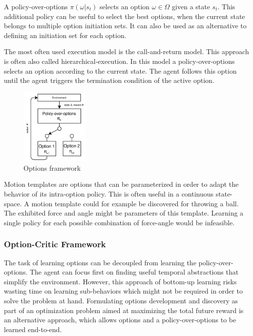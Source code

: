 A policy-over-options $\pi(\omega|s_t)$ selects an option $\omega \in \Omega$ given a state $s_t$. This additional policy can be useful
to select the best options, when the current state belongs to multiple option initiation sets. It can also be used as an alternative to defining
an initiation set for each option.

The most often used execution model is the call-and-return model. This approach is often also called hierarchical-execution.
In this model a policy-over-options selects an option according to the current state. The agent follows this option until the 
agent triggers the termination condition of the active option.

\begin{figure}[b]
    \centering
    \includegraphics[width=0.3\textwidth]{Images/options_framework.png}
    \caption{Options framework}
    \label{fig:options_framework}
\end{figure}

Motion templates \cite{motion_templates} are options that can be parameterized in order to adapt the behavior of its intra-option policy.
This is often useful in a continuous state-space. A motion template could for example be discovered for throwing a ball. The exhibited
force and angle might be parameters of this template. Learning a single policy for each possible combination of force-angle would be infeasible.

\subsubsection{Option-Critic Framework}

The task of learning options can be decoupled from learning the policy-over-options. The agent can focus first on finding useful temporal
abstractions that simplify the environment. However, this approach of bottom-up learning risks wasting time on learning sub-behaviors which might not be required
in order to solve the problem at hand. Formulating options development and discovery as part of an optimization problem aimed at maximizing the
total future reward is an alternative approach, which allows options and a policy-over-options to be learned end-to-end.

